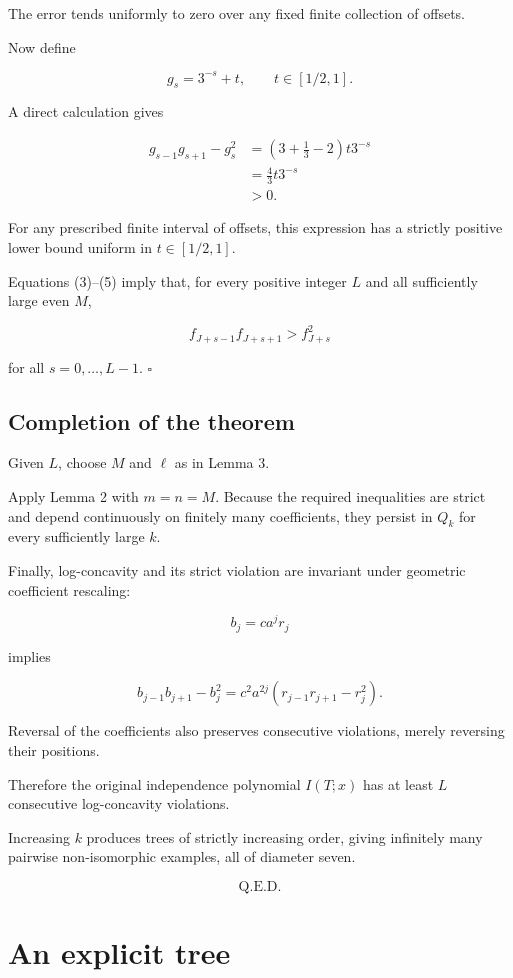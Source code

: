 \documentclass[11pt]{article}
\begin{document}
The error tends uniformly to zero over any fixed finite collection of offsets.

Now define

\[
g_s=3^{-s}+t,
\qquad t\in[1/2,1].
\]

A direct calculation gives

\[
\begin{aligned}
g_{s-1}g_{s+1}-g_s^2
&=\left(3+\frac13-2\right)t3^{-s}\\
&=\frac43t3^{-s}\\
&>0.
\end{aligned}
\tag{5}
\]

For any prescribed finite interval of offsets, this expression has a strictly positive lower bound uniform in \(t\in[1/2,1]\).

Equations (3)--(5) imply that, for every positive integer \(L\) and all sufficiently large even \(M\),

\[
f_{J+s-1}f_{J+s+1}>f_{J+s}^2
\]

for all \(s=0,\ldots,L-1\). \(\square\)

\subsection{Completion of the theorem}

Given \(L\), choose \(M\) and \(\ell\) as in Lemma 3.

Apply Lemma 2 with \(m=n=M\). Because the required inequalities are strict and depend continuously on finitely many coefficients, they persist in \(Q_k\) for every sufficiently large \(k\).

Finally, log-concavity and its strict violation are invariant under geometric coefficient rescaling:

\[
b_j=ca^j r_j
\]

implies

\[
b_{j-1}b_{j+1}-b_j^2
=c^2a^{2j}(r_{j-1}r_{j+1}-r_j^2).
\]

Reversal of the coefficients also preserves consecutive violations, merely reversing their positions.

Therefore the original independence polynomial \(I(T;x)\) has at least \(L\) consecutive log-concavity violations.

Increasing \(k\) produces trees of strictly increasing order, giving infinitely many pairwise non-isomorphic examples, all of diameter seven.

\[
\boxed{\text{Q.E.D.}}
\]

\section{An explicit tree}
\end{document}
